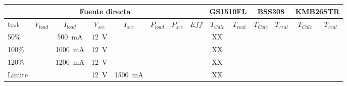 \begin{landscape}
    \begin{table}[H]
        \centering
        \renewcommand\theadfont{\bfseries}
        \setlength{\tabcolsep}{10pt}
        \renewcommand{\arraystretch}{1.5}
        \begin{tabular}{|l|c|c|c|c|c|c|c|c|c|c|c|c|c|}
            \hline
            \multicolumn{8}{|c|}{Fuente directa}    & \multicolumn{2}{|c|}{GS1510FL} & \multicolumn{2}{|c|}{BSS308} & \multicolumn{2}{|c|}{KMB26STR}                                                                                                                                           \\ \hline
            test                                    & $V_{load}$                     & $I_{load}$                   & $V_{src}$                      & $I_{src}$                & $P_{load}$ & $P_{src}$ & $Eff$ & $T_{Calc}$ & $T_{real}$ & $T_{Calc}$ & $T_{real}$ & $T_{Calc}$ & $T_{real}$ \\ \hline
            50\%                                    &                                & \SI{500}{\milli\ampere}      & \SI{12}{\volt}                 &                          &            &           &       & XX         &            &            &            &            &            \\ \hline

            100\%                                   &                                & \SI{1000}{\milli\ampere}     & \SI{12}{\volt}                 &                          &            &           &       & XX         &            &            &            &            &            \\ \hline

            120\%                                   &                                & \SI{1200}{\milli\ampere}     & \SI{12}{\volt}                 &                          &            &           &       & XX         &            &            &            &            &            \\ \hline

            Limite                                  &                                &                              & \SI{12}{\volt}                 & \SI{1500}{\milli\ampere} &            &           &       & XX         &            &            &            &            &            \\
            \hline


\end{tabular}
\end{table}
\end{landscape}
